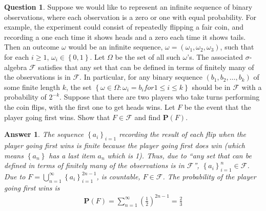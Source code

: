 \documentclass[utf8]{article}
\theoremstyle{definition}%
\newtheorem{question}{Question} %
\theoremstyle{plain}%
\newtheorem{answer}{Answer} %
\begin{document}
\begin{question}
    Suppose we would like to represent an infinite sequence of binary observations, where each observation is a zero or one with equal probability. For example, the experiment could consist of repeatedly flipping a fair coin, and recording a one each time it shows heads and a zero each time it shows tails. Then an outcome $\omega$ would be an infinite sequence, $\omega = \left(\omega_1, \omega_2, \omega_3\right)$, such that for each $i \geq 1$, $\omega_i \in \left\{0, 1\right\}$. Let $\varOmega$ be the set of all such $\omega$'s. The associated $\sigma$-algebra $\mathcal{F}$ satisfies that any set that can be defined in terms of finitely many of the observations is in $\mathcal{F}$. In particular, for any binary sequence $\left(b_1, b_2, \ldots, b_k\right)$ of some finite length $k$, the set $\left\{\omega \in \varOmega : \omega_i = b_i for 1 \leq i \leq k\right\}$ should be in $\mathcal{F}$ with a probability of $2^{-k}$. Suppose that there are two players who take turns performing the coin flips, with the first one to get heads wins. Let $F$ be the event that the player going first wins. Show that $F \in \mathcal{F}$ and find $\mathbf{P}\left(F\right)$.
\end{question}
\begin{answer}
    The sequence $\left\{a_i\right\}_{i=1}$ recording the result of each flip when the player going first wins is finite because the player going first does win (which means $\left\{a_n\right\}$ has a last item $a_n$ which is 1). Thus, due to ``any set that can be defined in terms of finitely many of the observations is in $\mathcal{F}$'', $\left\{a_i\right\}_{i=1}^{n} \in \mathcal{F}$. Due to $F = \bigcup_{n = 1}^{\infty} \left\{a_i\right\}_{i=1}^{2n-1}$, is countable, $F \in \mathcal{F}$. The probability of the player going first wins is
    \begin{align*}
        \mathbf{P}\left(F\right) = \sum_{n = 1}^{\infty} \left(\frac{1}{2}\right)^{2n-1} = \frac{2}{3}
    \end{align*}
\end{answer}
\end{document}
